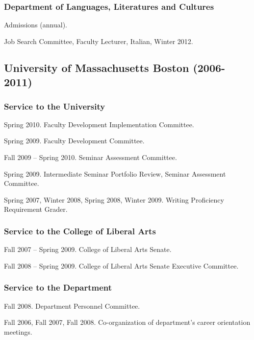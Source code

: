 \documentclass[11pt]{article}
\begin{document}
\vspace{-10pt}

\subsubsection*{Department of Languages, Literatures and Cultures}

 Admissions (annual).

Job Search Committee, Faculty Lecturer, Italian, Winter 2012.


\subsection*{University of Massachusetts Boston (2006-2011)}

\subsubsection*{Service to the University}

Spring 2010. Faculty Development Implementation Committee.

Spring 2009. Faculty Development Committee.

Fall 2009 -- Spring 2010. Seminar Assessment Committee.

Spring 2009. Intermediate Seminar Portfolio Review, Seminar Assessment Committee.

Spring 2007, Winter 2008, Spring 2008, Winter 2009. Writing Proficiency Requirement Grader.


\subsubsection*{Service to the College of Liberal Arts}

Fall 2007 -- Spring 2009. College of Liberal Arts Senate.

Fall 2008 -- Spring 2009. College of Liberal Arts Senate Executive Committee.

\subsubsection*{Service to the Department}

Fall 2008.  Department Personnel Committee.

Fall 2006, Fall 2007, Fall 2008. Co-organization of department's
career orientation meetings.
\end{document}
